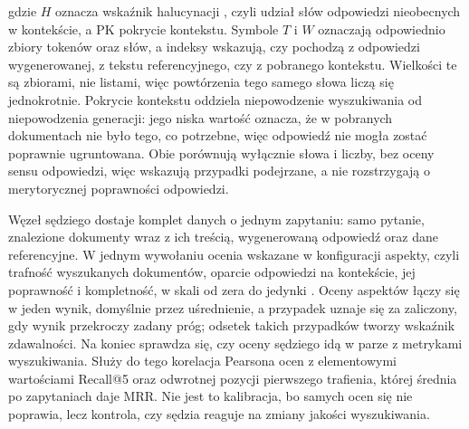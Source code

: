 gdzie $H$ oznacza wskaźnik halucynacji \cite{ji2023survey}, czyli udział słów odpowiedzi
nieobecnych w kontekście, a $\mathrm{PK}$ pokrycie kontekstu.
Symbole $T$ i $W$ oznaczają odpowiednio zbiory tokenów oraz słów,
a indeksy wskazują, czy pochodzą z odpowiedzi wygenerowanej, z tekstu
referencyjnego, czy z pobranego kontekstu. Wielkości te są zbiorami, nie listami, więc powtórzenia
tego samego słowa liczą się jednokrotnie. Pokrycie kontekstu oddziela niepowodzenie wyszukiwania od
niepowodzenia generacji: jego niska wartość oznacza, że w pobranych dokumentach nie było tego, co
potrzebne, więc odpowiedź nie mogła zostać poprawnie ugruntowana.
Obie porównują wyłącznie słowa i liczby, bez oceny sensu
odpowiedzi, więc wskazują przypadki podejrzane, a nie rozstrzygają o merytorycznej poprawności
odpowiedzi.

Węzeł sędziego dostaje komplet danych o jednym zapytaniu: samo pytanie, znalezione dokumenty wraz
z ich treścią, wygenerowaną odpowiedź oraz dane referencyjne. W jednym wywołaniu ocenia wskazane w
konfiguracji aspekty, czyli trafność wyszukanych dokumentów, oparcie odpowiedzi na kontekście, jej
poprawność i
kompletność, w skali od zera do jedynki \cite{zheng2023judging, es2024ragas}. Oceny aspektów łączy
się w jeden wynik, domyślnie przez uśrednienie, a przypadek uznaje się za zaliczony, gdy wynik
przekroczy zadany próg; odsetek takich przypadków tworzy wskaźnik zdawalności. Na koniec sprawdza
się, czy oceny sędziego idą w parze z metrykami wyszukiwania. Służy do tego korelacja Pearsona
ocen z elementowymi wartościami Recall@5 oraz odwrotnej pozycji pierwszego trafienia, której
średnia po zapytaniach daje MRR. Nie jest to kalibracja, bo samych ocen się nie poprawia, lecz
kontrola, czy sędzia reaguje na zmiany jakości wyszukiwania.

